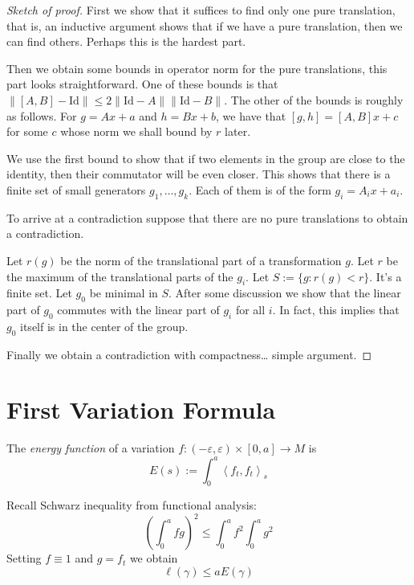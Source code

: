 \begin{proof}[Sketch of proof]
First we show that it suffices to find only one pure translation, that is, an
inductive argument shows that if we have a pure translation, then we can find
others. Perhaps this is the hardest part.
 
Then we obtain some bounds in operator norm for the pure translations, this part
looks straightforward.  One of these bounds is that $\|[A,B]-\text{Id}\|\leq
2\|\text{Id}-A\|\|\text{Id}-B\|$. The other of the bounds is roughly as follows.
For $g=Ax+a$ and $h=Bx+b$, we have that $[g,h]=[A,B]x+c$ for some $c$ whose norm
we shall bound by $r$ later.

We use the first bound to show that if two elements in the group are close to
the identity, then their commutator will be even closer. This shows that there
is a finite set of small generators $g_1,\ldots,g_k$. Each of them is of the
form $g_i=A_ix+a_i$.

To arrive at a contradiction suppose that there are no pure translations to
obtain a contradiction.

Let $r(g)$ be the norm of the translational part of a transformation $g$. Let
$r$ be the maximum of the translational parts of the $g_i$. 
Let $S:=\{g:r(g)<r\}$. It's a finite set. Let $g_0$ be minimal in $S$. After
some discussion we show that the linear part of $g_0$ commutes with the linear
part of $g_i$ for all $i$. In fact, this implies that $g_0$ itself is in the
center of the group.

Finally we obtain a contradiction with compactness… simple argument.
\end{proof}

\section{First Variation Formula}
\label{section-first-variation}

\begin{definition}
\label{definition-energy}
The {\it energy function} of a variation
$f:(-\varepsilon,\varepsilon)\times[0,a]\to M$ is
$$
E(s):=\int_0^a\left<f_t,f_t\right>_s
$$
\end{definition}

Recall Schwarz inequality from functional analysis:
$$
\left(\int_0^afg\right)^2\leq \int_0^af^2\int_0^ag^2
$$
Setting $f\equiv1$ and $g=f_t$ we obtain
 \begin{equation}
\label{equation-energy-bounds-length}
\ell(\gamma)\leq aE(\gamma)
\end{equation}

